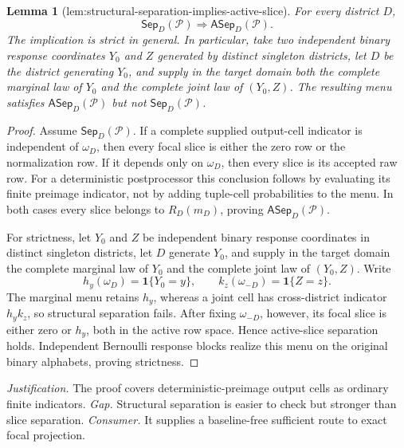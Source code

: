 \documentclass{article}
\newtheorem{lemma}{Lemma}
\begin{document}
\begin{lemma}[lem:structural-separation-implies-active-slice]\label{lem:structural-separation-implies-active-slice}
For every district \(D\),
\[
\mathsf{Sep}_D(\mathcal P)\Longrightarrow\mathsf{ASep}_D(\mathcal P).
\]
The implication is strict in general.  In particular, take two independent binary response coordinates \(Y_0\) and \(Z\) generated by distinct singleton districts, let \(D\) be the district generating \(Y_0\), and supply in the target domain both the complete marginal law of \(Y_0\) and the complete joint law of \((Y_0,Z)\).  The resulting menu satisfies \(\mathsf{ASep}_D(\mathcal P)\) but not \(\mathsf{Sep}_D(\mathcal P)\).
\end{lemma}
\begin{proof}
Assume \(\mathsf{Sep}_D(\mathcal P)\).  If a complete supplied output-cell indicator is independent of \(\omega_D\), then every focal slice is either the zero row or the normalization row.  If it depends only on \(\omega_D\), then every slice is its accepted raw row.  For a deterministic postprocessor this conclusion follows by evaluating its finite preimage indicator, not by adding tuple-cell probabilities to the menu.  In both cases every slice belongs to \(R_D(m_D)\), proving \(\mathsf{ASep}_D(\mathcal P)\).

For strictness, let \(Y_0\) and \(Z\) be independent binary response coordinates in distinct singleton districts, let \(D\) generate \(Y_0\), and supply in the target domain the complete marginal law of \(Y_0\) and the complete joint law of \((Y_0,Z)\).  Write
\[
h_y(\omega_D)=\mathbf 1\{Y_0=y\},
\qquad
k_z(\omega_{-D})=\mathbf 1\{Z=z\}.
\]
The marginal menu retains \(h_y\), whereas a joint cell has cross-district indicator \(h_yk_z\), so structural separation fails.  After fixing \(\omega_{-D}\), however, its focal slice is either zero or \(h_y\), both in the active row space.  Hence active-slice separation holds.  Independent Bernoulli response blocks realize this menu on the original binary alphabets, proving strictness.
\end{proof}
\par\smallskip\noindent \textit{Justification.} The proof covers deterministic-preimage output cells as ordinary finite indicators. \textit{Gap.} Structural separation is easier to check but stronger than slice separation. \textit{Consumer.} It supplies a baseline-free sufficient route to exact focal projection.
\end{document}
